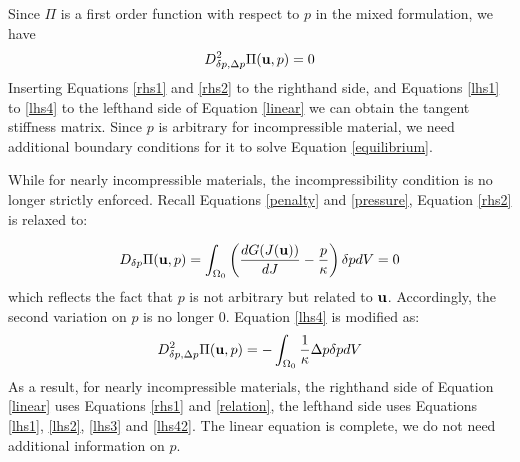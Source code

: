 Since $\Pi$ is a first order function with respect to $p$ in the mixed formulation, we have
\begin{equation} \label{lhs4}
D_{\delta{p}, \Delta{p}}^2 \Pi(\bold{u}, p) = 0
\end{equation}
Inserting Equations \ref{rhs1} and \ref{rhs2} to the righthand side, and Equations \ref{lhs1} to \ref{lhs4} to the lefthand side of Equation \ref{linear} we can obtain the tangent stiffness matrix. Since $p$ is arbitrary for incompressible material, we need additional boundary conditions for it to solve Equation \ref{equilibrium}.

While for nearly incompressible materials, the incompressibility condition is no longer strictly enforced. Recall Equations \ref{penalty} and \ref{pressure}, Equation \ref{rhs2} is relaxed to:

\begin{equation} \label{relation}
D_{\delta{p}}\Pi(\bold{u}, p) = \int_{\Omega_0}\left(  \frac{dG(J(\bold{u}))}{dJ} - \frac{p}{\kappa} \right)\delta{p}dV = 0
\end{equation}
which reflects the fact that $p$ is not arbitrary but related to $\bold{u}$.  
Accordingly, the second variation on $p$ is no longer $0$. Equation \ref{lhs4} is modified as:
\begin{equation} \label{lhs42}
D_{\delta{p}, \Delta{p}}^2 \Pi(\bold{u}, p) = - \int_{\Omega_0}\frac{1}{\kappa}\Delta{p}\delta{p}dV
\end{equation}
As a result, for nearly incompressible materials, the righthand side of Equation \ref{linear} uses Equations \ref{rhs1} and \ref{relation}, the lefthand side uses Equations \ref{lhs1}, \ref{lhs2}, \ref{lhs3} and \ref{lhs42}. The linear equation is complete, we do not need additional information on $p$.





